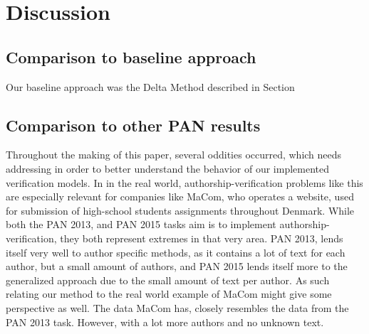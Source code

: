 \section{Discussion} \label{sec:discussion}

\subsection{Comparison to baseline approach}
Our baseline approach was the Delta Method described in Section 

\subsection{Comparison to other PAN results}

Throughout the making of this paper, several oddities occurred, which needs
addressing in order to better understand the behavior of our implemented
verification models. In in the real world, authorship-verification problems
like this are especially relevant for companies like MaCom, who operates a
website, used for submission of high-school students assignments throughout
Denmark. While both the PAN 2013, and PAN 2015 tasks aim is to implement
authorship-verification, they both represent extremes in that very area. PAN
2013, lends itself very well to author specific methods, as it contains a lot of
text for each author, but a small amount of authors, and PAN 2015 lends itself
more to the generalized approach due to the small amount of text per author. As
such relating our method to the real world example of MaCom might give some
perspective as well. The data MaCom has, closely resembles the data from the PAN
2013 task. However, with a lot more authors and no unknown text.

